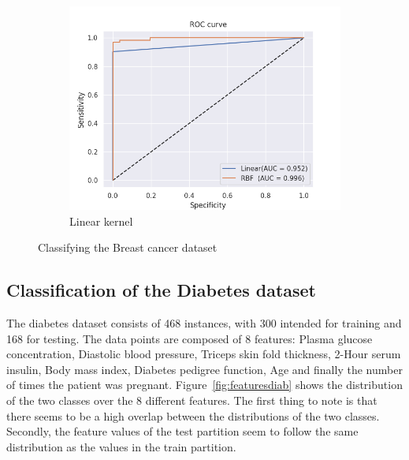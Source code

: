 \documentclass{article}
\begin{document}
\begin{figure}[]
\begin{subfigure}{0.45\linewidth}
            \includegraphics[width=\linewidth]{roc_breast}
            \caption{Linear kernel}
        \end{subfigure}
     
                   
\caption{Classifying the Breast cancer dataset}        
        
             
        \label{fig:brf}
    \end{figure}



\clearpage



\subsection{Classification of the Diabetes dataset}


The diabetes dataset consists of 468 instances, with 300 intended for training and 168 for testing. The data points are composed of 8 features: Plasma glucose concentration, Diastolic blood pressure, Triceps skin fold thickness, 2-Hour serum insulin, Body mass index, Diabetes pedigree function, Age and finally the number of times the patient was pregnant. Figure~\ref{fig:featuresdiab} shows the distribution of the two classes over the 8 different features. The first thing to note is that there seems to be a high overlap between the distributions of the two classes. Secondly, the feature values of the test partition seem to follow the same distribution as the values in the train partition.
\end{document}
